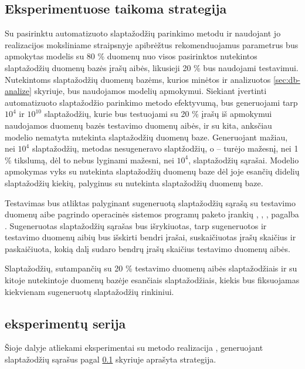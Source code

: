 \documentclass{VUMIFInfBakalaurinis}
\begin{document}
\subsection{Eksperimentuose taikoma strategija} \label{sec:strategy}
Su pasirinktu automatizuoto slaptažodžių parinkimo metodu ir naudojant jo 
realizacijos moksliniame straipsnyje apibrėžtus rekomenduojamus parametrus bus 
apmokytas modelis su 80 \% duomenų nuo visos pasirinktos nutekintos slaptažodžių 
duomenų bazės įrašų aibės, likusieji 20 \% bus naudojami testavimui. Nutekintoms 
slaptažodžių duomenų bazėms, kurios minėtos ir analizuotos \ref{sec:db-analize} 
skyriuje, bus naudojamos modelių apmokymui. Siekiant įvertinti automatizuoto 
slaptažodžio parinkimo metodo efektyvumą, bus generuojami tarp $10^{4}$ ir 
$10^{10}$ slaptažodžių, kurie bus testuojami su 20 \% įrašų iš apmokymui 
naudojamos duomenų bazės testavimo duomenų aibės, ir su kita, anksčiau modelio 
nematyta nutekinta slaptažodžių duomenų baze. Generuojant mažiau, nei $10^{4}$ 
slaptažodžių,  metodas nesugeneravo slaptžodžių, o 
 -- turėjo mažesnį, nei 1 \% tikslumą, dėl to nebus lyginami 
mažesni, nei $10^{4}$, slaptažodžių sąrašai. Modelio apmokymas vyks su 
 nutekinta slaptažodžių duomenų baze dėl joje esančių didelių 
slaptažodžių kiekių, palyginus su  nutekinta slaptažodžių 
duomenų baze.

Testavimas bus atliktas palyginant sugeneruotą slaptažodžių sąrašą su testavimo 
duomenų aibe  pagrindo operacinės sistemos programų paketo 
 įrankių , 
, ,  pagalba \cite{Coreutils}. 
Sugeneruotas slaptažodžių sąrašas bus išrykiuotas, tarp sugeneruotos ir 
testavimo duomenų aibių bus išskirti bendri įrašai, suskaičiuotas įrašų skaičius 
ir paskaičiuota, kokią dalį sudaro bendrų įrašų skaičius testavimo duomenų 
aibės.

Slaptažodžių, sutampančių su 20 \% testavimo duomenų aibės slaptažodžiais ir su 
kitoje nutekintoje duomenų bazėje esančiais slaptažodžiais, kiekis bus 
fiksuojamas kiekvienam sugeneruotų slaptažodžių rinkiniui.

\subsection{ eksperimentų serija}
Šioje dalyje atliekami eksperimentai su  metodo realizacija 
\cite{PassGAN:impl}, generuojant slaptažodžių sąrašus pagal \ref{sec:strategy} 
skyriuje aprašyta strategija.
\end{document}
